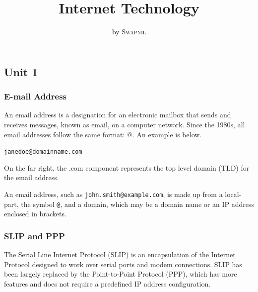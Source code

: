 \documentclass[twocolumn, a4paper]{article}
\title{Internet Technology}
\author{ by
  \textsc{Swapnil}%
}
\date{}
\begin{document}
  \maketitle

\begin{tcolorbox}
  \part{Unit 1}
\end{tcolorbox}
\section{E-mail Address}
An email address is a designation for an electronic mailbox that sends and
receives messages, known as email, on a computer network. Since the 1980s, all
email addresses follow the same format: @. An example is below.

\begin{center}
  \verb+janedoe@domainname.com+
\end{center}
On the far right, the .com component represents the top level domain (TLD) for
the email address.

An email address, such as \verb+john.smith@example.com+, is made up from a
local-part, the symbol \verb+@+, and a domain, which may be a domain name or
an IP address enclosed in brackets.

\section{SLIP and PPP}
The Serial Line Internet Protocol (SLIP) is an encapsulation of the Internet
Protocol designed to work over serial ports and modem connections. SLIP has
been largely replaced by the Point-to-Point Protocol (PPP), which has more
features and does not require a predefined IP address configuration.
\end{document}
